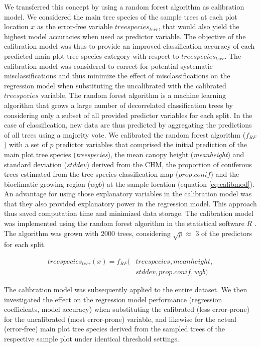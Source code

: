 {We transferred this concept by using a random forest algorithm \citep{breiman2001} as calibration model. We considered the main tree species of the sample trees at each plot location $x$ as the error-free variable $treespecies_{terr}$, that would also yield the highest model accuracies when used as predictor variable. The objective of the calibration model was thus to provide an improved classification accuracy of each predicted main plot tree species category with respect to $treespecies_{terr}$. The calibration model was considered to correct for potential systematic misclassifications and thus minimize the effect of misclassifications on the regression model when substituting the uncalibrated with the calibrated $treespecies$ variable. The random forest algorithm is a machine learning algorithm that grows a large number of decorrelated classification trees by considering only a subset of all provided predictor variables for each split. In the case of classification, new data are thus predicted by aggregating the predictions of all trees using a majority vote. We calibrated the random forest algorithm ($f_{RF}$) with a set of $p$ predictor variables that comprised the initial prediction of the main plot tree species (\textit{treespecies}), the mean canopy height (\textit{meanheight}) and standard deviation ($stddev$) derived from the CHM, the proportion of coniferous trees estimated from the tree species classification map ($prop.conif$) and the bioclimatic growing region ($wgb$) at the sample location (equation \ref{eq:calibmod}). An advantage for using those explanatory variables in the calibration model was that they also provided explanatory power in the regression model. This approach thus saved computation time and minimized data storage. The calibration model was implemented using the random forest algorithm \citep{liaw2002} in the statistical software $R$ \citep{R}. The algorithm was grown with 2000 trees, considering $\sqrt{p} \approx$ 3 of the predictors for each split.\par

\begin{equation} \label{eq:calibmod}
\begin{split}
treespecies_{terr}(x) = f_{RF}(&treespecies, meanheight, \\
&stddev, prop.conif, wgb)
\end{split}
\end{equation}

The calibration model was subsequently applied to the entire dataset. We then investigated the effect on the regression model performance (regression coefficients, model accuracy) when substituting the calibrated (less error-prone) for the uncalibrated (most error-prone) variable, and likewise for the actual (error-free) main plot tree species derived from the sampled trees of the respective sample plot under identical threshold settings.\par

}

